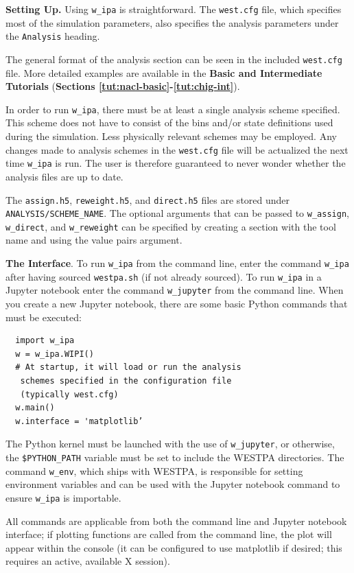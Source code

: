 \textbf{Setting Up.}  Using \verb|w_ipa| is straightforward. 
The \verb|west.cfg| file, which specifies most of the simulation parameters, also specifies the analysis parameters under the \verb|Analysis| heading.

The general format of the analysis section can be seen in the included \verb|west.cfg| file. 
More detailed examples are available in the \textbf{Basic and Intermediate Tutorials} (\textbf{Sections \ref{tut:nacl-basic}-\ref{tut:chig-int}}).

In order to run \verb|w_ipa|, there must be at least a single analysis scheme specified. 
This scheme does not have to consist of the bins and/or state definitions used during the simulation. 
Less physically relevant schemes may be employed. 
Any changes made to analysis schemes in the \verb|west.cfg| file will be actualized the next time \verb|w_ipa| is run. 
The user is therefore guaranteed to never wonder whether the analysis files are up to date. 

The \verb|assign.h5|, \verb|reweight.h5|, and \verb|direct.h5| files are stored under \verb|ANALYSIS/SCHEME_NAME|.
The optional arguments that can be passed to \verb|w_assign|, \verb|w_direct|, and \verb|w_reweight| can be specified by creating a section with the tool name and using the value pairs argument. 

\textbf{The Interface}. To run \verb|w_ipa| from the command line, enter the command \verb|w_ipa| after having sourced \verb|westpa.sh| (if not already sourced). 
To run \verb|w_ipa| in a Jupyter notebook enter the command \verb|w_jupyter| from the command line. 
When you create a new Jupyter notebook, there are some basic Python commands that must be executed:

\begin{verbatim}
  import w_ipa
  w = w_ipa.WIPI()
  # At startup, it will load or run the analysis
   schemes specified in the configuration file
   (typically west.cfg)
  w.main()
  w.interface = 'matplotlib’
\end{verbatim}

The Python kernel must be launched with the use of \verb|w_jupyter|, or otherwise, the \verb|$PYTHON_PATH| variable must be set to include the WESTPA directories. 
The command \verb|w_env|, which ships with WESTPA, is responsible for setting environment variables and can be used with the Jupyter notebook command to ensure \verb|w_ipa| is importable.

All commands are applicable from both the command line and Jupyter notebook interface; if plotting functions are called from the command line, the plot will appear within the console (it can be configured to use matplotlib if desired; this requires an active, available X session).


